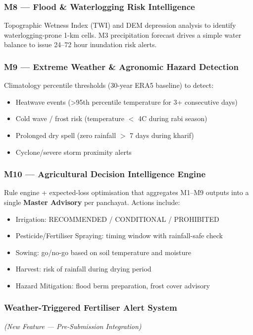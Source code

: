 \documentclass[12pt,a4paper]{article}
\begin{document}
\subsubsection{M8 --- Flood \& Waterlogging Risk Intelligence}
Topographic Wetness Index (TWI) and DEM depression analysis to identify waterlogging-prone 1-km cells. M3 precipitation forecast drives a simple water balance to issue 24--72 hour inundation risk alerts.

\subsubsection{M9 --- Extreme Weather \& Agronomic Hazard Detection}
Climatology percentile thresholds (30-year ERA5 baseline) to detect:
\begin{itemize}[leftmargin=*, noitemsep]
  \item Heatwave events (>95th percentile temperature for 3+ consecutive days)
  \item Cold wave / frost risk (temperature $<$ 4\textdegree C during rabi season)
  \item Prolonged dry spell (zero rainfall $>$ 7 days during kharif)
  \item Cyclone/severe storm proximity alerts
\end{itemize}

\subsubsection{M10 --- Agricultural Decision Intelligence Engine}
Rule engine + expected-loss optimisation that aggregates M1--M9 outputs into a single \textbf{Master Advisory} per panchayat. Actions include:
\begin{itemize}[leftmargin=*, noitemsep]
  \item Irrigation: RECOMMENDED / CONDITIONAL / PROHIBITED
  \item Pesticide/Fertiliser Spraying: timing window with rainfall-safe check
  \item Sowing: go/no-go based on soil temperature and moisture
  \item Harvest: risk of rainfall during drying period
  \item Hazard Mitigation: flood berm preparation, frost cover advisory
\end{itemize}

\subsubsection{Weather-Triggered Fertiliser Alert System}
\textit{(New Feature --- Pre-Submission Integration)}
\end{document}
